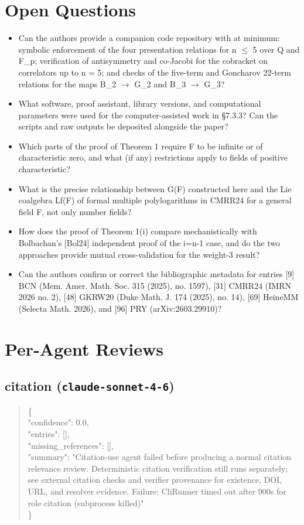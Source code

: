\documentclass[11pt]{article}
\begin{document}
\section*{Open Questions}
\begin{itemize}[leftmargin=*]
  \item Can the authors provide a companion code repository with at minimum: symbolic enforcement of the four presentation relations for n \ensuremath{\le} 5 over Q and F\_p; verification of antisymmetry and co-Jacobi for the cobracket on correlators up to n = 5; and checks of the five-term and Goncharov 22-term relations for the maps B\_2 \ensuremath{\to} G\_2 and B\_3 \ensuremath{\to} G\_3?
  \item What software, proof assistant, library versions, and computational parameters were used for the computer-assisted work in §7.3.3? Can the scripts and raw outputs be deposited alongside the paper?
  \item Which parts of the proof of Theorem 1 require F to be infinite or of characteristic zero, and what (if any) restrictions apply to fields of positive characteristic?
  \item What is the precise relationship between G(F) constructed here and the Lie coalgebra Lf(F) of formal multiple polylogarithms in CMRR24 for a general field F, not only number fields?
  \item How does the proof of Theorem 1(i) compare mechanistically with Bolbachan's [Bol24] independent proof of the i=n-1 case, and do the two approaches provide mutual cross-validation for the weight-3 result?
  \item Can the authors confirm or correct the bibliographic metadata for entries [9] BCN (Mem. Amer. Math. Soc. 315 (2025), no. 1597), [31] CMRR24 (IMRN 2026 no. 2), [48] GKRW20 (Duke Math. J. 174 (2025), no. 14), [69] HeineMM (Selecta Math. 2026), and [96] PRY (arXiv:2603.29910)?
\end{itemize}

\section*{Per-Agent Reviews}
\subsection*{citation (\texttt{claude-sonnet-4-6})}
\begin{quote}\small\ttfamily\raggedright
\{\\
  "confidence": 0.0,\\
  "entries": [],\\
  "missing\_references": [],\\
  "summary": "Citation-use agent failed before producing a normal citation relevance review. Deterministic citation verification still runs separately; see external citation checks and verifier provenance for existence, DOI, URL, and resolver evidence. Failure: CliRunner timed out after 900s for role citation (subprocess killed)"\\
\}\\
\end{quote}
\end{document}
